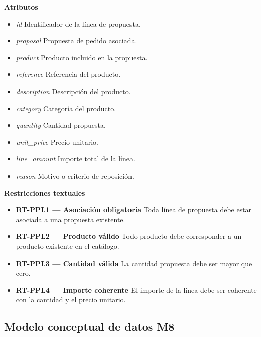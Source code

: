 \textbf{Atributos}

\begin{itemize}

      \item \textit{id}
            Identificador de la línea de propuesta.
      \item \textit{proposal}
            Propuesta de pedido asociada.
      \item \textit{product}
            Producto incluido en la propuesta.
      \item \textit{reference}
            Referencia del producto.
      \item \textit{description}
            Descripción del producto.
      \item \textit{category}
            Categoría del producto.
      \item \textit{quantity}
            Cantidad propuesta.
      \item \textit{unit\_price}
            Precio unitario.
      \item \textit{line\_amount}
            Importe total de la línea.
      \item \textit{reason}
            Motivo o criterio de reposición.

\end{itemize}

\textbf{Restricciones textuales}

\begin{itemize}

      \item \textbf{RT-PPL1 — Asociación obligatoria}
            Toda línea de propuesta debe estar asociada a una propuesta existente.
      \item \textbf{RT-PPL2 — Producto válido}
            Todo producto debe corresponder a un producto existente en el catálogo.

      \item \textbf{RT-PPL3 — Cantidad válida}
            La cantidad propuesta debe ser mayor que cero.
      \item \textbf{RT-PPL4 — Importe coherente}
            El importe de la línea debe ser coherente con la cantidad y el precio unitario.

\end{itemize}

\subsection{Modelo conceptual de datos M8}

